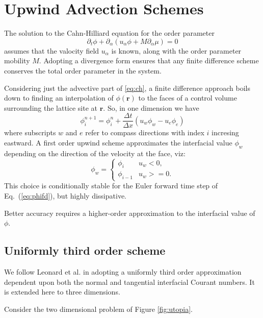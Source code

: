 \section{Upwind Advection Schemes}

The solution to the Cahn-Hilliard equation for the order parameter
\begin{equation}
\partial_t \phi + \partial_\alpha (u_\alpha \phi + M\partial_\alpha \mu) = 0
\label{eq:ch}
\end{equation}
assumes that the valocity field $u_\alpha$ is known, along with the
order parameter mobility $M$. Adopting a divergence form ensures that
any finite difference scheme conserves the total order parameter in
the system.

Considering just the advective part of \ref{eq:ch}, a finite difference
approach boils down to finding an interpolation of $\phi(\mathbf{r})$ to
the faces of a control volume surrounding the lattice site at $\mathbf{r}$.
So, in one dimension we have
\begin{equation}
\phi_i^{n+1} = \phi_i^n + \frac{\Delta t}{\Delta x} (u_w \phi_w - u_e \phi_e)
\label{eq:phifd}
\end{equation}
where subscripts $w$ and $e$ refer to compass directions with index $i$
incresing eastward. A first order upwind scheme approximates the
interfacial value $\phi_w$ depending on the direction of the velocity
at the face, viz:
\begin{equation}
\phi_w = \left\{
\begin{array}{ll} \phi_i & u_w < 0, \\ \phi_{i-1} & u_w >= 0.
\end{array} \right.
\end{equation}
This choice is conditionally stable for the Euler forward time step
of Eq.~(\ref{eq:phifd}), but highly dissipative.



Better accuracy requires
a higher-order approximation to the interfacial value of $\phi$.

\subsection{Uniformly third order scheme}

We follow Leonard et al. \cite{utopia} in adopting a uniformly third
order approximation dependent upon both the normal and tangential
interfacial Courant numbers. It is extended here to three dimensions.

Consider the two dimensional problem of Figure \ref{fig:utopia}.

